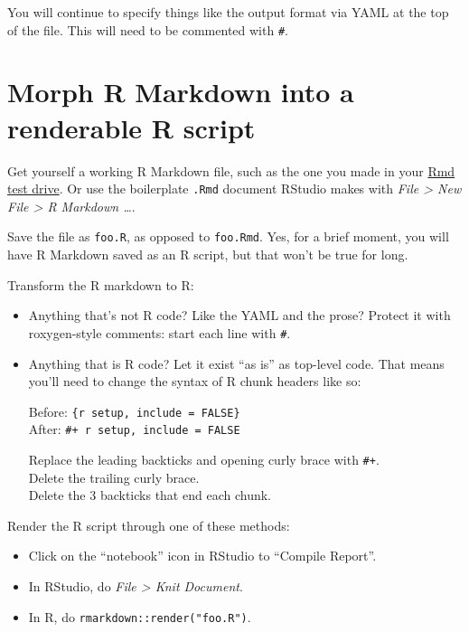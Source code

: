 \documentclass[
]{book}
\providecommand{\tightlist}{%
  \setlength{\itemsep}{0pt}\setlength{\parskip}{0pt}}
\begin{document}
You will continue to specify things like the output format via YAML at the top of the file.
This will need to be commented with \texttt{\#\textquotesingle{}}.

\section{Morph R Markdown into a renderable R script}\label{morph-r-markdown-into-a-renderable-r-script}

Get yourself a working R Markdown file, such as the one you made in your \hyperref[rmd-test-drive]{Rmd test drive}.
Or use the boilerplate \texttt{.Rmd} document RStudio makes with \emph{File \textgreater{} New File \textgreater{} R Markdown \ldots{}}.

Save the file as \texttt{foo.R}, as opposed to \texttt{foo.Rmd}.
Yes, for a brief moment, you will have R Markdown saved as an R script, but that won't be true for long.

Transform the R markdown to R:

\begin{itemize}
\item
  Anything that's not R code?
  Like the YAML and the prose?
  Protect it with roxygen-style comments: start each line with \texttt{\#\textquotesingle{}}.
\item
  Anything that is R code?
  Let it exist ``as is'' as top-level code.
  That means you'll need to change the syntax of R chunk headers like so:

  Before: \texttt{\textasciigrave{}\textasciigrave{}\textasciigrave{}\{r\ setup,\ include\ =\ FALSE\}}\\
  After: \texttt{\#+\ r\ setup,\ include\ =\ FALSE}

  Replace the leading backticks and opening curly brace with \texttt{\#+}.\\
  Delete the trailing curly brace.\\
  Delete the 3 backticks that end each chunk.
\end{itemize}

Render the R script through one of these methods:

\begin{itemize}
\tightlist
\item
  Click on the ``notebook'' icon in RStudio to ``Compile Report''.
\item
  In RStudio, do \emph{File \textgreater{} Knit Document}.
\item
  In R, do \texttt{rmarkdown::render("foo.R")}.
\end{itemize}
\end{document}
